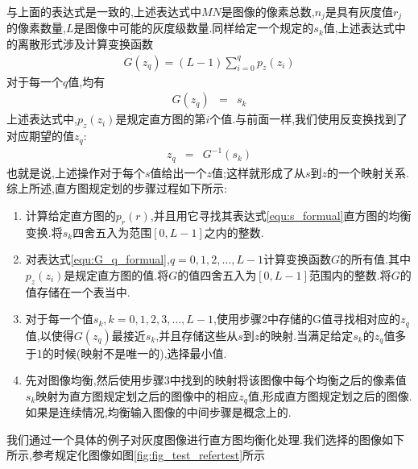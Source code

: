 \documentclass[UTF8,a4paper,10pt]{ctexart}
\begin{document}
\begin{flushleft}
        与上面的表达式是一致的,上述表达式中$MN$是图像的像素总数,$n_{j}$是具有灰度值$r_{j}$的像素数量,$L$是图像中可能的灰度级数量.同样给定一个规定的$s_{k}$值,上述表达式中的离散形式涉及计算变换函数
        \begin{eqnarray}
            G(z_{q})=(L-1)\sum\limits_{i=0}^{q}p_{z}(z_{i})\label{equ:G_q_formual}
        \end{eqnarray}
        对于每一个$q$值,均有
        \begin{eqnarray}
            G(z_{q})&=&s_{k}\nonumber
        \end{eqnarray}
        上述表达式中,$p_{z}(z_{i})$是规定直方图的第$i$个值.与前面一样,我们使用反变换找到了对应期望的值$z_{q}$:
        \begin{eqnarray}
            z_{q}&=&G^{-1}(s_{k})\nonumber
        \end{eqnarray}
        也就是说,上述操作对于每个$s$值给出一个$z$值;这样就形成了从$s$到$z$的一个映射关系.\\
        \hspace{2em}综上所述,直方图规定划的步骤过程如下所示:
        \begin{enumerate}
            \item 计算给定直方图的$p_{r}(r)$,并且用它寻找其表达式\ref{equ:s_formual}直方图的均衡变换.将$s_{k}$四舍五入为范围$[0,L-1]$之内的整数.
            \item 对表达式\ref{equ:G_q_formual},$q=0,1,2,\dots,L-1$计算变换函数$G$的所有值.其中$p_{z}(z_{i})$是规定直方图的值.将$G$的值四舍五入为$[0,L-1]$范围内的整数.将$G$的值存储在一个表当中.
            \item 对于每一个值$s_{k},k=0,1,2,3,\dots,L-1$,使用步骤2中存储的G值寻找相对应的$z_{q}$值,以使得$G(z_{q})$最接近$s_{k}$,并且存储这些从$s$到$z$的映射.当满足给定$s_{k}$的$z_{q}$值多于1的时候(映射不是唯一的),选择最小值.
            \item 先对图像均衡,然后使用步骤3中找到的映射将该图像中每个均衡之后的像素值$s_{k}$映射为直方图规定划之后的图像中的相应$z_{q}$值,形成直方图规定划之后的图像.如果是连续情况,均衡输入图像的中间步骤是概念上的.
        \end{enumerate}
        \hspace{2em}我们通过一个具体的例子对灰度图像进行直方图均衡化处理.我们选择的图像如下所示,参考规定化图像如图\ref{fig:fig_test_refertest}所示\\
        \begin{figure}[htbp]
            \centering
\end{figure}
\end{flushleft}
\end{document}
